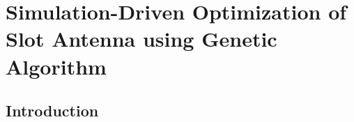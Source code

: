 \chapter{Simulation-Driven Optimization of Slot Antenna using Genetic Algorithm}
\label{chap:chap3}
\section{Introduction}\label{c3sec_intro}
%
%
